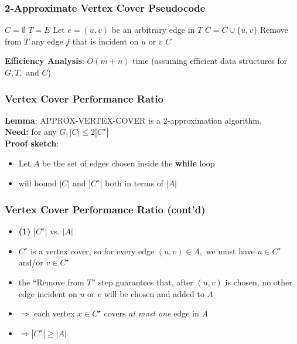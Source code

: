 \documentclass[10pt,aspectratio=169]{beamer}
\begin{document}
      \begin{frame} \frametitle{2-Approximate Vertex Cover Pseudocode}
        \begin{algorithmic}[1]
            \State $C=\emptyset$
            \State $T=E$ 
              \State Let $e=(u, v)$ be an arbitrary edge in $T$
              \State $C = C \cup \{u, v \}$
              \State Remove from $T$ any edge $f$ that is incident on $u$ or $v$
            \EndWhile
            \State \Return $C$
          \EndFunction
        \end{algorithmic}
      \vspace{.5cm}
      \textbf{Efficiency Analysis}: $O(m+n)$ time (assuming efficient data structures
      for $G, T,$ and $C$)
      \end{frame}
      
      \begin{frame} \frametitle{Vertex Cover Performance Ratio}
      \textbf{Lemma}: APPROX-VERTEX-COVER is a 2-approximation algorithm. \\
      \textbf{Need:} for any $G, |C| \leq 2 |C^\star|$ \\
      \textbf{Proof sketch}:
      \begin{itemize}
        \item Let $A$ be the set of edges chosen inside the \textbf{while} loop
        \item will bound $|C|$ and $|C^\star|$ both in terms of $|A|$
      \end{itemize}
      \end{frame}
        
      \begin{frame} \frametitle{Vertex Cover Performance Ratio (cont'd)}
      \begin{itemize}
        \item \textbf{(1)} $|C^\star|$ vs. $|A|$
        \item $C^\star$ is a vertex cover, so for every edge $(u, v) \in A,$ we must have
          $u \in C^\star$ and/or $v \in C^\star$
        \item the ``Remove from $T$'' step guarantees that, after $(u, v)$ is chosen,
          no other edge incident on $u$ or $v$ will be chosen and added to $A$
        \item $\Rightarrow$ each vertex $x \in C^\star$ covers \emph{at most one} edge in $A$
        \item $\Rightarrow |C^\star| \geq |A|$
      \end{itemize}
      \end{frame}
      
\end{document}

